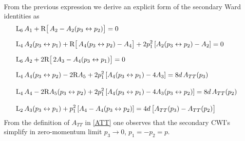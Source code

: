 \documentclass[a4paper,11pt,openright,twoside]{book}
\numberwithin{equation}{section}
\begin{document}
{{{\begin{align}
\end{align}
From the previous expression we derive an explicit form of the secondary Ward identities as
\begin{align}
	&\textup{L}_6\, A_1 + \textup{R}\bigl[\, A_2-A_2(p_3\leftrightarrow p_2)\bigr]=0\label{Tsec1}\\[1.5ex] 
	&\textup{L}_4\, A_2(p_3\leftrightarrow p_1) + \textup{R}\bigl[\, A_4(p_3\leftrightarrow p_2)-A_4\bigr]+2p_1^2\left[A_2(p_3\leftrightarrow p_2)-A_2\right]=0\\[1.5 ex] 
	&\textup{L}_6\, A_2 + 2\textup{R}\bigl[\,2A_3-A_4(p_3\leftrightarrow p_1)\bigr]=0\\[1.5 ex] 
	&\textup{L}_4\, A_4(p_3\leftrightarrow p_2)  - 2\textup{R}A_5+2p_1^2\left[A_4(p_3\leftrightarrow p_1)-4A_3\right]=8d\,A_{TT}(p_3)\\[2 ex] 
	&\textup{L}_4\, A_4- 2\textup{R}A_5(p_3\leftrightarrow p_2)  +2p_1^2\left[A_4(p_3\leftrightarrow p_1)-4A_3(p_3\leftrightarrow p_2)  \right]=8d\,A_{TT}(p_2)\\[2 ex]  
	&\textup{L}_2\, A_3(p_3\leftrightarrow p_1) +p_1^2\left[A_4-A_4(p_3\leftrightarrow p_2)\right]=4d\,\big[A_{TT}(p_3)-A_{TT}(p_2)\big]\label{F14}
\end{align}
From the definition of $A_{TT}$ in \eqref{ATT} one observes that the secondary CWI's simplify in zero-momentum limit $p_3\to0$, $p_1=-p_2=p$. 

}}}
\end{document}
